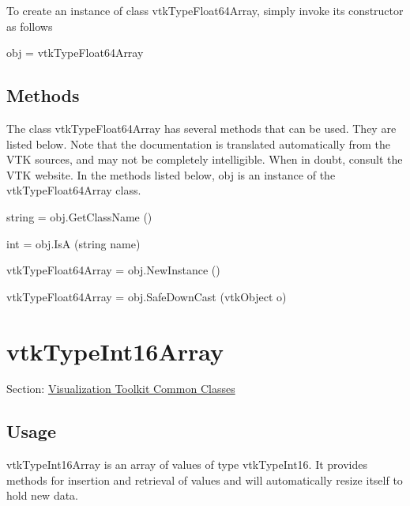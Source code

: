 To create an instance of class vtk\-Type\-Float64\-Array, simply invoke its constructor as follows \begin{DoxyVerb}  obj = vtkTypeFloat64Array
\end{DoxyVerb}
 \hypertarget{vtkwidgets_vtkxyplotwidget_Methods}{}\subsection{Methods}\label{vtkwidgets_vtkxyplotwidget_Methods}
The class vtk\-Type\-Float64\-Array has several methods that can be used. They are listed below. Note that the documentation is translated automatically from the V\-T\-K sources, and may not be completely intelligible. When in doubt, consult the V\-T\-K website. In the methods listed below, {\ttfamily obj} is an instance of the vtk\-Type\-Float64\-Array class. 
\begin{DoxyItemize}
\item {\ttfamily string = obj.\-Get\-Class\-Name ()}  
\item {\ttfamily int = obj.\-Is\-A (string name)}  
\item {\ttfamily vtk\-Type\-Float64\-Array = obj.\-New\-Instance ()}  
\item {\ttfamily vtk\-Type\-Float64\-Array = obj.\-Safe\-Down\-Cast (vtk\-Object o)}  
\end{DoxyItemize}\hypertarget{vtkcommon_vtktypeint16array}{}\section{vtk\-Type\-Int16\-Array}\label{vtkcommon_vtktypeint16array}
Section\-: \hyperlink{sec_vtkcommon}{Visualization Toolkit Common Classes} \hypertarget{vtkwidgets_vtkxyplotwidget_Usage}{}\subsection{Usage}\label{vtkwidgets_vtkxyplotwidget_Usage}
vtk\-Type\-Int16\-Array is an array of values of type vtk\-Type\-Int16. It provides methods for insertion and retrieval of values and will automatically resize itself to hold new data.

